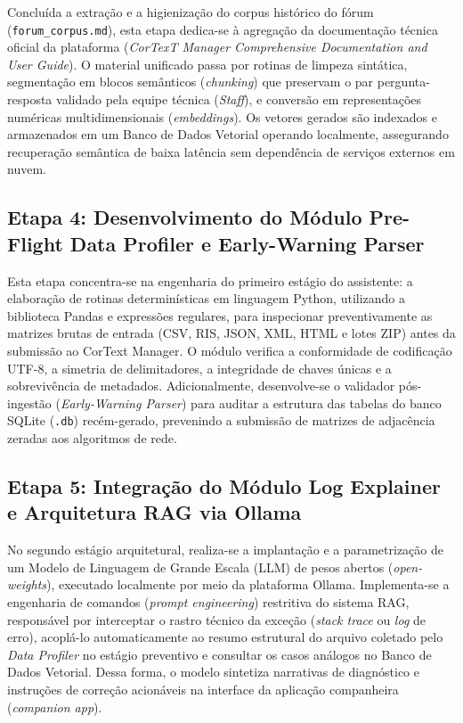 \documentclass[
	oneside,
	a4paper,
	12pt,
	chapter=TITLE,
	section=TITLE,
	english,
	brazilian
]{abntex2}
\begin{document}
Concluída a extração e a higienização do corpus histórico do fórum (\texttt{forum\_\allowbreak corpus.\allowbreak md}), esta etapa dedica-se à agregação da documentação técnica oficial da plataforma (\textit{CorTexT Manager Comprehensive Documentation and User Guide}). O material unificado passa por rotinas de limpeza sintática, segmentação em blocos semânticos (\textit{chunking}) que preservam o par pergunta-resposta validado pela equipe técnica (\textit{Staff}), e conversão em representações numéricas multidimensionais (\textit{embeddings}). Os vetores gerados são indexados e armazenados em um Banco de Dados Vetorial operando localmente, assegurando recuperação semântica de baixa latência sem dependência de serviços externos em nuvem.

\FloatBarrier
\subsection{Etapa 4: Desenvolvimento do Módulo Pre-Flight Data Profiler e Early-Warning Parser}\label{sec:etapa_4_desenvolvimento_do_modulo_pre_fl}


Esta etapa concentra-se na engenharia do primeiro estágio do assistente: a elaboração de rotinas determinísticas em linguagem Python, utilizando a biblioteca Pandas e expressões regulares, para inspecionar preventivamente as matrizes brutas de entrada (CSV, RIS, JSON, XML, HTML e lotes ZIP) antes da submissão ao CorText Manager. O módulo verifica a conformidade de codificação UTF-8, a simetria de delimitadores, a integridade de chaves únicas e a sobrevivência de metadados. Adicionalmente, desenvolve-se o validador pós-ingestão (\textit{Early-Warning Parser}) para auditar a estrutura das tabelas do banco SQLite (\texttt{.db}) recém-gerado, prevenindo a submissão de matrizes de adjacência zeradas aos algoritmos de rede.

\FloatBarrier
\subsection{Etapa 5: Integração do Módulo Log Explainer e Arquitetura RAG via Ollama}\label{sec:etapa_5_integracao_do_modulo_log_explain}


No segundo estágio arquitetural, realiza-se a implantação e a parametrização de um Modelo de Linguagem de Grande Escala (LLM) de pesos abertos (\textit{open-weights}), executado localmente por meio da plataforma Ollama. Implementa-se a engenharia de comandos (\textit{prompt engineering}) restritiva do sistema RAG, responsável por interceptar o rastro técnico da exceção (\textit{stack trace} ou \textit{log} de erro), acoplá-lo automaticamente ao resumo estrutural do arquivo coletado pelo \textit{Data Profiler} no estágio preventivo e consultar os casos análogos no Banco de Dados Vetorial. Dessa forma, o modelo sintetiza narrativas de diagnóstico e instruções de correção acionáveis na interface da aplicação companheira (\textit{companion app}).
\end{document}

